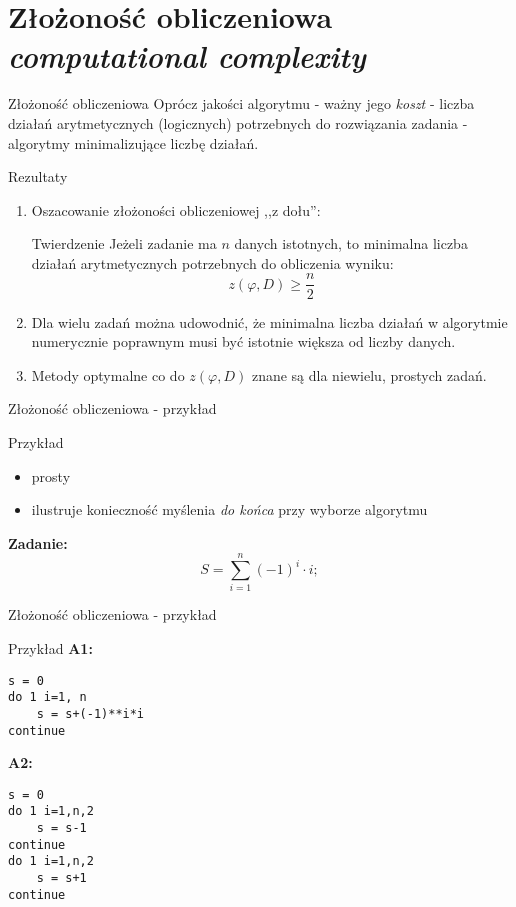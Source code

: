 \section{Złożoność obliczeniowa {\it computational complexity}}
\begin{frame}{Złożoność obliczeniowa}
	Oprócz jakości algorytmu - ważny jego {\it koszt} - liczba działań arytmetycznych (logicznych) potrzebnych do rozwiązania zadania - algorytmy minimalizujące liczbę działań.
\end{frame}
\begin{frame}{Rezultaty}
	\begin{enumerate}
		\item Oszacowanie złożoności obliczeniowej ,,z dołu'': 
		\begin{block}{Twierdzenie}
		Jeżeli zadanie ma $n$ danych istotnych, to minimalna liczba działań arytmetycznych potrzebnych do obliczenia wyniku:
        \[
        	z(\varphi, D) \ge \frac{n}{2}
        \]
        \end{block}
        \item Dla wielu zadań można udowodnić, że minimalna liczba działań w algorytmie numerycznie poprawnym musi być istotnie większa od liczby danych.
        \item Metody optymalne co do $z(\varphi, D)$ znane są dla niewielu, prostych zadań.
	\end{enumerate}
\end{frame}
\begin{frame}{Złożoność obliczeniowa - przykład}
	\begin{exampleblock}{Przykład}
        \begin{itemize}
            \item prosty
            \item ilustruje konieczność myślenia {\it do końca} przy wyborze algorytmu
        \end{itemize}
        {\bf Zadanie:}
        \[
        	S = \sum_{i=1}^n (-1)^i \cdot i;
        \]
	\end{exampleblock}
\end{frame}
\begin{frame}[fragile]{Złożoność obliczeniowa - przykład}
	\begin{exampleblock}{Przykład}
    	{\bf A1:}
    	\begin{lstlisting}[escapechar=|]
s = 0
do 1 i=1, n
    s = s+(-1)**i*i
continue \end{lstlisting}
		\vspace{-15pt}
    	{\bf A2:}
    	\begin{lstlisting}[escapechar=|]
s = 0
do 1 i=1,n,2
    s = s-1
continue
do 1 i=1,n,2
	s = s+1
continue \end{lstlisting}
		\vspace{-15pt}
	\end{exampleblock}
\end{frame}
